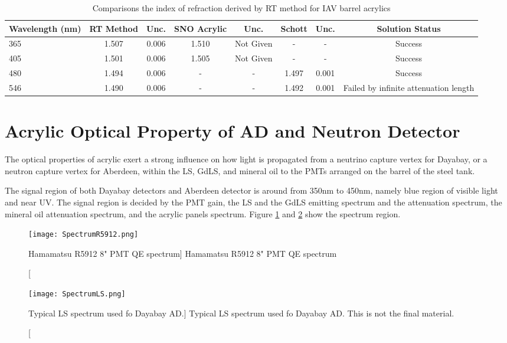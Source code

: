\begin{table}
\centering
\caption{Comparisons the index of refraction derived by RT method for IAV barrel acrylics}
\label{tab:RTMethodResult}
\begin{tabular}{lccccccc}
\hline
Wavelength (nm) & RT Method & Unc. & SNO Acrylic & Unc. & Schott & Unc. & Solution Status\\
\hline
\hline
365 & 1.507 & 0.006 & 1.510 & Not Given & - & - & Success\\
\hline
405 & 1.501 & 0.006 & 1.505 & Not Given & - & - & Success\\
\hline
480 & 1.494 & 0.006 & - & - & 1.497 & 0.001 & Success\\
\hline
546 & 1.490 & 0.006 & - & - & 1.492 & 0.001 & Failed by infinite attenuation length\\
\hline
\end{tabular}
\end{table}


\section {Acrylic Optical Property of AD and Neutron Detector}

The optical properties of acrylic exert a strong influence on how light is propagated
from a neutrino capture vertex for Dayabay, or a neutron capture vertex for Aberdeen,
within the LS, GdLS, and mineral oil to the PMTs arranged on the barrel of the steel tank.

The signal region of both Dayabay detectors and Aberdeen detector
is around from 350nm to 450nm, namely blue region of visible light and near UV.
The signal region is decided by the PMT gain, the LS and the GdLS emitting spectrum and
the attenuation spectrum, the mineral oil attenuation spectrum, and
the acrylic panels spectrum. Figure \ref{fig:SpectrumR5912} and \ref{fig:SpectrumLS} show the spectrum region.


\begin{figure}
    \label{fig:SpectrumR5912}
    \centering
    \texttt{[image: SpectrumR5912.png]}
    \caption
    [Hamamatsu R5912 8" PMT QE spectrum]
    {Hamamatsu R5912 8" PMT QE spectrum}
    \end{figure}


\begin{figure}
    \label{fig:SpectrumLS}
    \centering
    \texttt{[image: SpectrumLS.png]}
    \caption
    [Typical LS spectrum used fo Dayabay AD.]
    {Typical LS spectrum used fo Dayabay AD. This is not the final material.}
    \end{figure}


